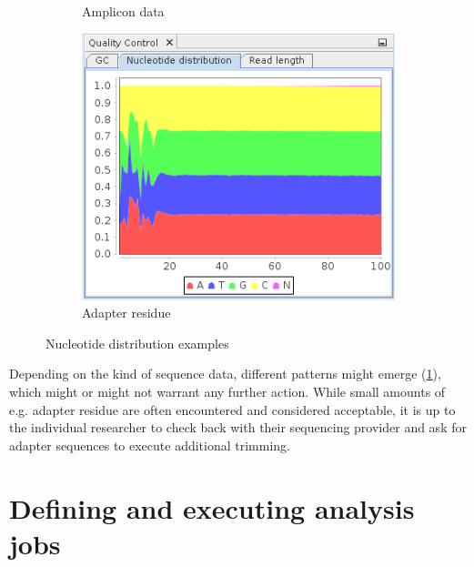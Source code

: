 \begin{figure}[H]
\begin{subfigure}[b]{0.3\textwidth}
                \caption{Amplicon data}
        \end{subfigure}
        \begin{subfigure}[b]{0.3\textwidth}
                \includegraphics[width=\textwidth]{img/mgx/adapterNucl}
                \caption{Adapter residue}
        \end{subfigure}
        \caption{Nucleotide distribution examples}
  \label{qc4}
\end{figure}

Depending on the kind of sequence data, different patterns might emerge (\ref{qc4}),
which might or might not warrant any further action. While small amounts of e.g. 
adapter residue are often encountered and considered acceptable, it is up to the
individual researcher to check back with their sequencing provider and ask for
adapter sequences to execute additional trimming.

\section{Defining and executing analysis jobs}

